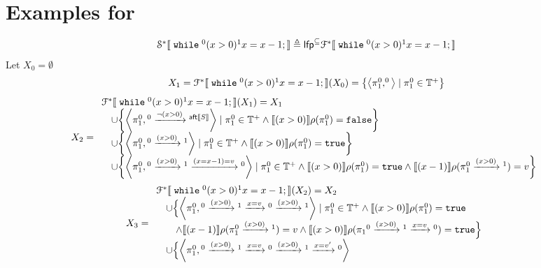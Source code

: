 \section{Examples for \cite{cousot2019abstract}}
\begin{example}
\[
 \begin{array}{l}
 \mathcal{S}^{*}\llbracket 
 \;\mathtt{while}\; {}^0 (x > 0) {}^1 x = x - 1;
  \rrbracket \triangleq \mathsf{lfp}^\subseteq\mathcal{F}^*\llbracket \;\mathtt{while}\; {}^0 (x > 0) {}^1 x = x - 1; \rrbracket
  \end{array}
 \]
 Let $X_0 =  \emptyset$
 \[
 \begin{array}{l}
X_1 = 
\mathcal{F}^*\sem{\ewhile {}^0 (x > 0) {}^1 x = x - 1;}(X_0) = \left\{ \left< \pi_1^0, ^0\right> \mid \pi_1^0 \in \mathbb{T^{+}} \right\}
  \end{array}
 \]
 \[
 X_2 = \begin{array}{l}
 \mathcal{F}^*\sem{\ewhile {}^0 (x > 0) {}^1 x = x - 1;}(X_1) = X_1
  \\
 \quad \cup \left\{ \left< \pi_1^0, {}^0 \xrightarrow{\neg(x > 0)} {}^{\mathsf{aft}\sem{S}} \right> 
 \mid \pi_1^0 \in \mathbb{T^{+}} \land 
 \sem{(x > 0)}\env(\pi_1^0) = \efalse \right\}
\\
 \quad \cup \left\{ \left< \pi_1^0, {}^0 \xrightarrow{(x > 0)} {}^1 \right> 
 \mid \pi_1^0 \in \mathbb{T^{+}} \land 
 \sem{(x > 0)}\env(\pi_1^0) = \etrue \right\}
 \\
 \quad \cup \left\{ \left< \pi_1^0, {}^0 \xrightarrow{(x > 0)} {}^1 \xrightarrow{(x = x - 1) = v} {}^0 \right> 
 \mid \pi_1^0 \in \mathbb{T^{+}} \land 
 \sem{(x > 0)}\env(\pi_1^0) = \etrue  \land
 \sem{(x - 1)}\env(\pi_1^0 \xrightarrow{(x > 0)} {}^1) = v \right\}
 \end{array}
 \]
  \[
 X_3 = \begin{array}{l}
 \mathcal{F}^*\sem{\ewhile {}^0 (x > 0) {}^1 x = x - 1;}(X_2) = X_2
  \\
  \quad \cup \Big\{ \left< \pi_1^0, {}^0 \xrightarrow{(x > 0)} {}^1 \xrightarrow{x = v} {}^0 \xrightarrow{(x > 0)} {}^1 \right> 
 \mid \pi_1^0 \in \mathbb{T^{+}} \land 
 \sem{(x > 0)}\env(\pi_1^0) = \etrue  
 \\ \qquad \land
 \sem{(x - 1)}\env(\pi_1^0 \xrightarrow{(x > 0)} {}^1) = v
 \land 
 \sem{(x > 0)}\env(\pi_1{}^0 \xrightarrow{(x > 0)} {}^1 \xrightarrow{x = v} {}^0) = \etrue  \Big\}
  \\
	\quad \cup \Big\{ \left< \pi_1^0, {}^0 \xrightarrow{(x > 0)} {}^1 \xrightarrow{x = v} {}^0 \xrightarrow{(x > 0)} {}^1 \xrightarrow{x = v'} {}^0 \right> 

\end{array}\]
\end{example}
